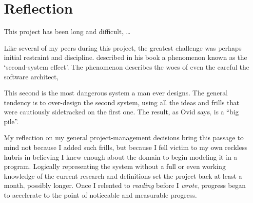 \section{Reflection}
\label{sec:reflection}

This project has been long and difficult, \dots

Like several of my peers during this project,
  the greatest challenge was perhaps initial restraint and discipline.
\citeauthor{brooks:mythical-man-month} described in his book 
  a phenomenon known as the \enquote*{second-system effect}.
The phenomenon describes the woes of even the careful the software architect,
\begin{displayquote}
  This second is the most dangerous system a man ever designs.
  \Elide
  The general tendency is to over-design the second system,
    using all the ideas and frills that were cautiously sidetracked on the first one.
  The result, as Ovid says, is a \enquote{big pile}.
\end{displayquote}
My reflection on my general project-management decisions bring this passage to mind
  not because I added such frills, but because I fell victim to my own reckless hubris
  in believing I knew enough about the domain to begin modeling it in a program.
Logically representing the system without a full \Dash or even working \Dash
  knowledge of the current research and definitions set the project back at least a month, possibly longer.
Once I relented to \emph{reading} before I \emph{wrote},
  progress began to accelerate to the point of noticeable and measurable progress.

